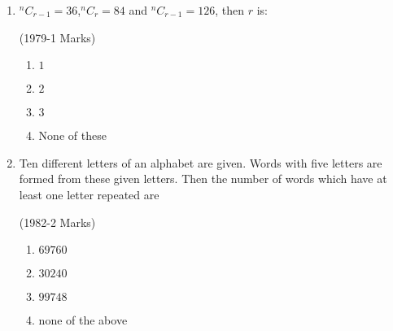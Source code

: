 \documentclass[journal,10pt,twocolumn]{IEEEtran}
\theoremstyle{remark}
\begin{document}
\begin{enumerate}
\item  $^nC_{r-1}=36$,$^nC_r=84$ and $^nC_{r-1}=126$, then $r$ is:

\hfill {(1979-1 Marks)}\\
\begin{enumerate}[label=\alph*)]
 \item $1$
 \item $2$
 \item $3$
\item  None of these
\end{enumerate}
\item Ten different letters of an alphabet are given. Words with
 five letters are formed from these given letters. Then the
 number of words which have at least one letter repeated are
 
\hfill {(1982-2 Marks)}\\
\begin{enumerate}[label=\alph*)]
 \item $69760$
 \item $30240$
 \item $99748$
 \item none of the above
 \end{enumerate}
\end{enumerate}
\end{document}
